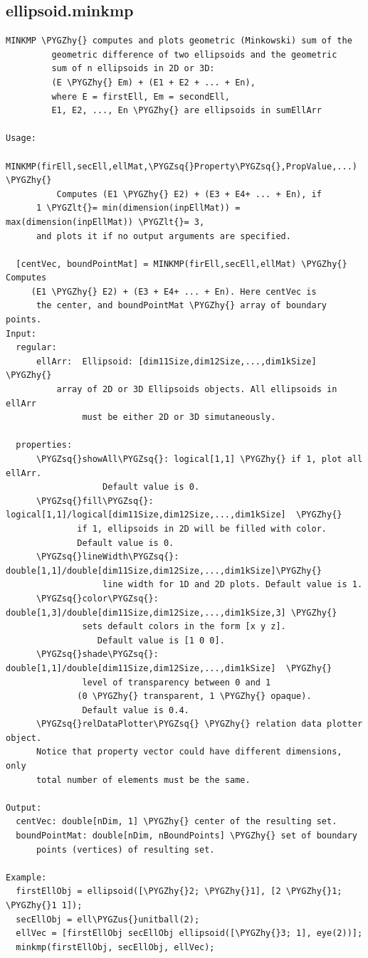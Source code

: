 \documentclass[letterpaper,10pt,english]{sphinxmanual}
\def\PYGZus{\char`\_}
\def\PYGZlt{\char`\<}
\def\PYGZhy{\char`\-}
\def\PYGZsq{\char`\'}
\begin{document}
\subsection{ellipsoid.minkmp}
\label{chap_functions:ellipsoid-minkmp}
\begin{Verbatim}[commandchars=\\\{\}]
MINKMP \PYGZhy{} computes and plots geometric (Minkowski) sum of the
         geometric difference of two ellipsoids and the geometric
         sum of n ellipsoids in 2D or 3D:
         (E \PYGZhy{} Em) + (E1 + E2 + ... + En),
         where E = firstEll, Em = secondEll,
         E1, E2, ..., En \PYGZhy{} are ellipsoids in sumEllArr

Usage:
  MINKMP(firEll,secEll,ellMat,\PYGZsq{}Property\PYGZsq{},PropValue,...) \PYGZhy{}
          Computes (E1 \PYGZhy{} E2) + (E3 + E4+ ... + En), if
      1 \PYGZlt{}= min(dimension(inpEllMat)) = max(dimension(inpEllMat)) \PYGZlt{}= 3,
      and plots it if no output arguments are specified.

  [centVec, boundPointMat] = MINKMP(firEll,secEll,ellMat) \PYGZhy{} Computes
     (E1 \PYGZhy{} E2) + (E3 + E4+ ... + En). Here centVec is
      the center, and boundPointMat \PYGZhy{} array of boundary points.
Input:
  regular:
      ellArr:  Ellipsoid: [dim11Size,dim12Size,...,dim1kSize] \PYGZhy{}
          array of 2D or 3D Ellipsoids objects. All ellipsoids in ellArr
               must be either 2D or 3D simutaneously.

  properties:
      \PYGZsq{}showAll\PYGZsq{}: logical[1,1] \PYGZhy{} if 1, plot all ellArr.
                   Default value is 0.
      \PYGZsq{}fill\PYGZsq{}: logical[1,1]/logical[dim11Size,dim12Size,...,dim1kSize]  \PYGZhy{}
              if 1, ellipsoids in 2D will be filled with color.
              Default value is 0.
      \PYGZsq{}lineWidth\PYGZsq{}: double[1,1]/double[dim11Size,dim12Size,...,dim1kSize]\PYGZhy{}
                   line width for 1D and 2D plots. Default value is 1.
      \PYGZsq{}color\PYGZsq{}: double[1,3]/double[dim11Size,dim12Size,...,dim1kSize,3] \PYGZhy{}
               sets default colors in the form [x y z].
                  Default value is [1 0 0].
      \PYGZsq{}shade\PYGZsq{}: double[1,1]/double[dim11Size,dim12Size,...,dim1kSize]  \PYGZhy{}
               level of transparency between 0 and 1
              (0 \PYGZhy{} transparent, 1 \PYGZhy{} opaque).
               Default value is 0.4.
      \PYGZsq{}relDataPlotter\PYGZsq{} \PYGZhy{} relation data plotter object.
      Notice that property vector could have different dimensions, only
      total number of elements must be the same.

Output:
  centVec: double[nDim, 1] \PYGZhy{} center of the resulting set.
  boundPointMat: double[nDim, nBoundPoints] \PYGZhy{} set of boundary
      points (vertices) of resulting set.

Example:
  firstEllObj = ellipsoid([\PYGZhy{}2; \PYGZhy{}1], [2 \PYGZhy{}1; \PYGZhy{}1 1]);
  secEllObj = ell\PYGZus{}unitball(2);
  ellVec = [firstEllObj secEllObj ellipsoid([\PYGZhy{}3; 1], eye(2))];
  minkmp(firstEllObj, secEllObj, ellVec);
\end{Verbatim}
\end{document}
